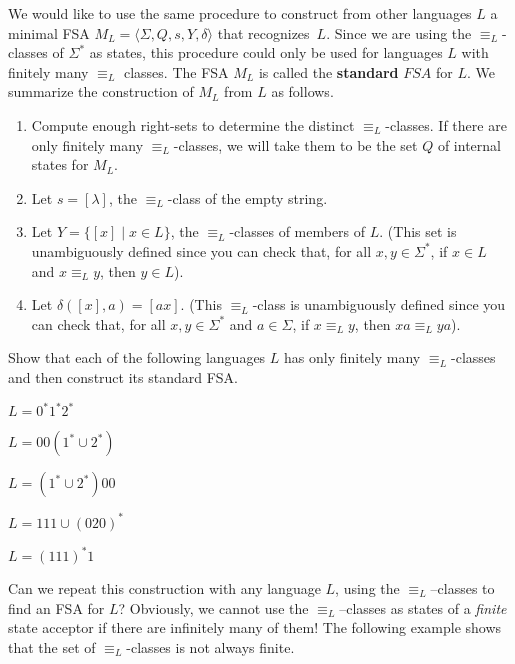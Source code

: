 We would like to use the same procedure to construct from other languages $L$ a minimal FSA $M_L = \langle \Sigma, Q, s, Y, \delta \rangle$ that recognizes~$L$.  Since we are using the $\equiv_L$-classes of $\Sigma^*$ as states, this procedure could only be used for languages $L$ with finitely many $\equiv_L$ classes.  The FSA $M_L$ is called the \textbf{standard} $FSA$ for $L$.  We summarize the construction of $M_L$ from $L$ as follows.
\begin{enumerate}
   \item Compute enough right-sets to determine the distinct $\equiv_L$-classes.  If there are only finitely many $\equiv_L$-classes, we will take them to be the set $Q$ of internal states for $M_L$.
   \item Let $s = [\lambda]$, the $\equiv_L$-class of the empty string.
   \item Let $Y = \{[x] \mid x\in L\}$, the $\equiv_L$-classes of members of $L$. (This set is unambiguously defined since you can check that, for all $x,y\in \Sigma^*$, if $x\in L$ and $x\equiv_L y$, then $y\in L$).
   \item Let $\delta([x],a) = [ax]$. (This $\equiv_L$-class is unambiguously defined since you can check that, for all $x,y\in \Sigma^*$ and $a\in \Sigma$, if $x\equiv_L y$, then $xa \equiv_L ya$).
\end{enumerate}

Show that each of the following languages $L$ has only finitely many $\equiv_L$-classes and then construct its standard FSA.

\begin{prb}
$L = 0^*1^*2^*$
\end{prb}

\begin{prb}
$L = 00(1^*\cup 2^*)$
\end{prb}

\begin{prb}
$L = (1^*\cup 2^*)00$
\end{prb}

\begin{prb}
$L = 111\cup(020)^*$
\end{prb}

\begin{prb}
$L = (111)^*1$
\end{prb}

Can we repeat this construction with any language $L$, using the $\equiv_L$--classes to find an FSA for $L$?  Obviously, we cannot use the $\equiv_L$--classes as states of a \emph{finite} state acceptor if there are infinitely many of them!   The following example shows that the set of $\equiv_L$-classes is not always finite.

